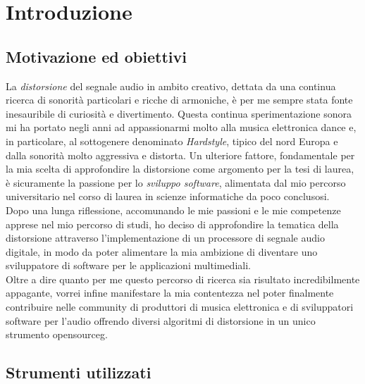 
\chapter{Introduzione}
\label{cap:introduzione}

\section{Motivazione ed obiettivi}

La \textit{distorsione} del segnale audio in ambito creativo, dettata da una continua ricerca di sonorità particolari e ricche di armoniche, è per me sempre stata fonte inesauribile di curiosità e divertimento. Questa continua sperimentazione sonora mi ha portato negli anni ad appassionarmi molto alla musica elettronica dance e, in particolare, al sottogenere denominato \textit{Hardstyle}, tipico del nord Europa e dalla sonorità molto aggressiva e distorta. Un ulteriore fattore, fondamentale per la mia scelta di approfondire la distorsione come argomento per la tesi di laurea, è sicuramente la passione per lo \textit{sviluppo software}, alimentata dal mio percorso universitario nel corso di laurea in scienze informatiche da poco conclusosi. \\
Dopo una lunga riflessione, accomunando le mie passioni e le mie competenze apprese nel mio percorso di studi, ho deciso di approfondire la tematica della distorsione attraverso l'implementazione di un processore di segnale audio digitale, in modo da poter alimentare la mia ambizione di diventare uno sviluppatore di software per le applicazioni multimediali. \\
Oltre a dire quanto per me questo percorso di ricerca sia risultato incredibilmente appagante, vorrei infine manifestare la mia contentezza nel poter finalmente contribuire nelle community di produttori di musica elettronica e di sviluppatori software per l'audio offrendo diversi algoritmi di distorsione in un unico strumento \gls{opensourceg}.

\section{Strumenti utilizzati}

